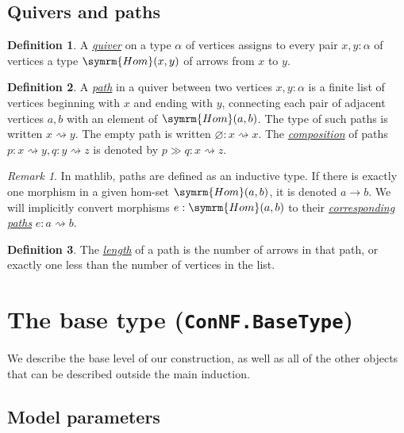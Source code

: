 \documentclass{article}
\newcommand{\mdef}[3]{\href{https://leanprover-community.github.io/mathlib4\_docs/Mathlib/#1.html\##2}{\emph{#3}}}
\theoremstyle{definition}
\newtheorem{definition}{Definition}[section]
\theoremstyle{remark}
\newtheorem*{remark}{Remark}
\begin{document}
\subsection{Quivers and paths}

\begin{definition}
    A \mdef{Combinatorics/Quiver/Basic}{Quiver}{quiver} on a type \( \alpha \) of vertices assigns to every pair \( x, y : \alpha \) of vertices a type \( \symrm{Hom}(x, y) \) of arrows from \( x \) to \( y \).
\end{definition}
\begin{definition}
    A \mdef{Combinatorics/Quiver/Path}{Quiver.Path}{path} in a quiver between two vertices \( x, y : \alpha \) is a finite list of vertices beginning with \( x \) and ending with \( y \), connecting each pair of adjacent vertices \( a, b \) with an element of \( \symrm{Hom}(a, b) \).
    The type of such paths is written \( x \rightsquigarrow y \).
    The empty path is written \( \varnothing : x \rightsquigarrow x \).
    The \mdef{Combinatorics/Quiver/Path}{Quiver.Path.comp}{composition} of paths \( p : x \rightsquigarrow y, q : y \rightsquigarrow z \) is denoted by \( p \gg q : x \rightsquigarrow z \).
\end{definition}
\begin{remark}
    In mathlib, paths are defined as an inductive type.
    If there is exactly one morphism in a given hom-set \( \symrm{Hom}(a, b) \), it is denoted \( a \to b \).
    We will implicitly convert morphisms \( e : \symrm{Hom}(a, b) \) to their \mdef{Combinatorics/Quiver/Path}{Quiver.Hom.toPath}{corresponding paths} \( e : a \rightsquigarrow b \).
\end{remark}
\begin{definition}
    The \mdef{Combinatorics/Quiver/Path}{Quiver.Path.length}{length} of a path is the number of arrows in that path, or exactly one less than the number of vertices in the list.
\end{definition}

\section{The base type (\texttt{ConNF.BaseType})}

We describe the base level of our construction, as well as all of the other objects that can be described outside the main induction.

\subsection{Model parameters}
\end{document}
